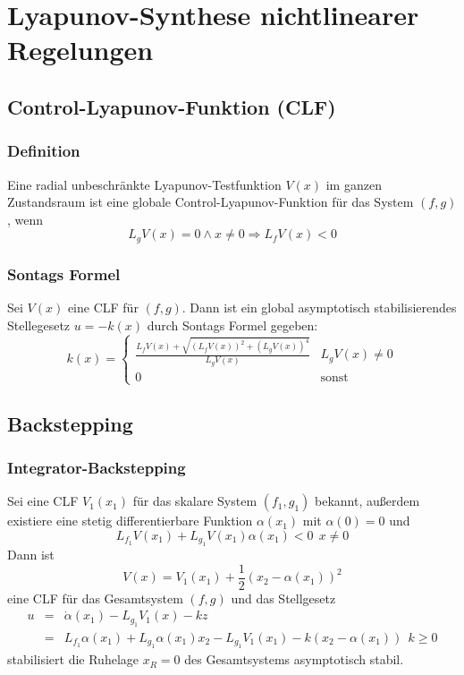 \chapter{Lyapunov-Synthese nichtlinearer Regelungen}
\section{Control-Lyapunov-Funktion (CLF)}
\subsection{Definition}
Eine radial unbeschränkte Lyapunov-Testfunktion $V(x)$ im ganzen Zustandsraum ist eine
globale Control-Lyapunov-Funktion für das System $(f, g)$, wenn
\begin{equation}
    L_g V(x) = 0 \land x \neq 0 \Rightarrow L_f V(x) < 0
\end{equation}

\subsection{Sontags Formel}
Sei $V(x)$ eine CLF für $(f, g)$. Dann ist ein global asymptotisch stabilisierendes
Stellegesetz $u=-k(x)$ durch Sontags Formel gegeben:
\begin{equation}
    k(x) = \begin{cases}
        \frac{L_f V(x) + \sqrt{ {(L_f V(x))}^2 + {(L_g V(x))}^4}}{L_g V(x)} & L_g V(x) \neq 0 \\
        0 & \text{sonst}
    \end{cases}
\end{equation}

\section{Backstepping}
\subsection{Integrator-Backstepping}
Sei eine CLF $V_1(x_1)$ für das skalare System $(f_1, g_1)$ bekannt, außerdem existiere
eine stetig differentierbare Funktion $\alpha(x_1)$ mit $\alpha(0)=0$ und
\begin{equation}
    L_{f_1} V(x_1) + L_{g_1} V(x_1) \alpha(x_1) < 0\ \ x \neq 0
\end{equation}
Dann ist
\begin{equation}
    V(x) = V_1(x_1) + \frac{1}{2} {(x_2 - \alpha(x_1))}^2
\end{equation}
eine CLF für das Gesamtsystem $(f, g)$ und das Stellgesetz
\begin{eqnarray}
    u &=& \dot{\alpha}(x_1) - L_{g_1} V_1(x) - kz \\
        &=& L_{f_1} \alpha(x_1) + L_{g_1} \alpha(x_1) x_2 - L_{g_1} V_1(x_1) - k(x_2 - \alpha(x_1))\ \ k \geq 0
\end{eqnarray}
stabilisiert die Ruhelage $x_R=0$ des Gesamtsystems asymptotisch stabil.

